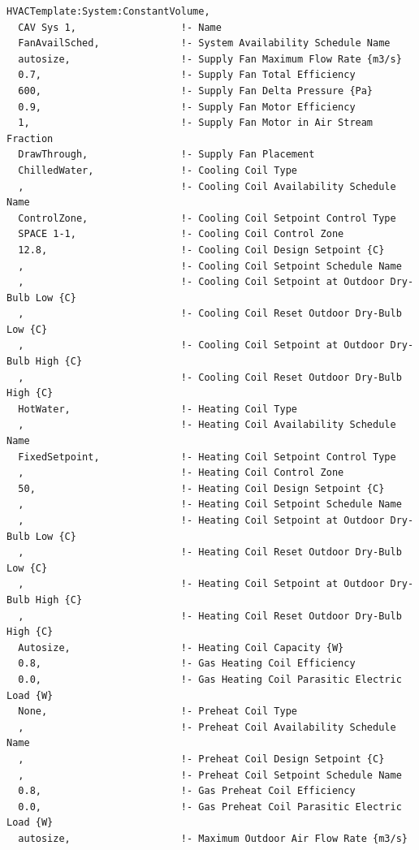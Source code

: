 \begin{lstlisting}
HVACTemplate:System:ConstantVolume,
  CAV Sys 1,                  !- Name
  FanAvailSched,              !- System Availability Schedule Name
  autosize,                   !- Supply Fan Maximum Flow Rate {m3/s}
  0.7,                        !- Supply Fan Total Efficiency
  600,                        !- Supply Fan Delta Pressure {Pa}
  0.9,                        !- Supply Fan Motor Efficiency
  1,                          !- Supply Fan Motor in Air Stream Fraction
  DrawThrough,                !- Supply Fan Placement
  ChilledWater,               !- Cooling Coil Type
  ,                           !- Cooling Coil Availability Schedule Name
  ControlZone,                !- Cooling Coil Setpoint Control Type
  SPACE 1-1,                  !- Cooling Coil Control Zone
  12.8,                       !- Cooling Coil Design Setpoint {C}
  ,                           !- Cooling Coil Setpoint Schedule Name
  ,                           !- Cooling Coil Setpoint at Outdoor Dry-Bulb Low {C}
  ,                           !- Cooling Coil Reset Outdoor Dry-Bulb Low {C}
  ,                           !- Cooling Coil Setpoint at Outdoor Dry-Bulb High {C}
  ,                           !- Cooling Coil Reset Outdoor Dry-Bulb High {C}
  HotWater,                   !- Heating Coil Type
  ,                           !- Heating Coil Availability Schedule Name
  FixedSetpoint,              !- Heating Coil Setpoint Control Type
  ,                           !- Heating Coil Control Zone
  50,                         !- Heating Coil Design Setpoint {C}
  ,                           !- Heating Coil Setpoint Schedule Name
  ,                           !- Heating Coil Setpoint at Outdoor Dry-Bulb Low {C}
  ,                           !- Heating Coil Reset Outdoor Dry-Bulb Low {C}
  ,                           !- Heating Coil Setpoint at Outdoor Dry-Bulb High {C}
  ,                           !- Heating Coil Reset Outdoor Dry-Bulb High {C}
  Autosize,                   !- Heating Coil Capacity {W}
  0.8,                        !- Gas Heating Coil Efficiency
  0.0,                        !- Gas Heating Coil Parasitic Electric Load {W}
  None,                       !- Preheat Coil Type
  ,                           !- Preheat Coil Availability Schedule Name
  ,                           !- Preheat Coil Design Setpoint {C}
  ,                           !- Preheat Coil Setpoint Schedule Name
  0.8,                        !- Gas Preheat Coil Efficiency
  0.0,                        !- Gas Preheat Coil Parasitic Electric Load {W}
  autosize,                   !- Maximum Outdoor Air Flow Rate {m3/s}

\end{lstlisting}
